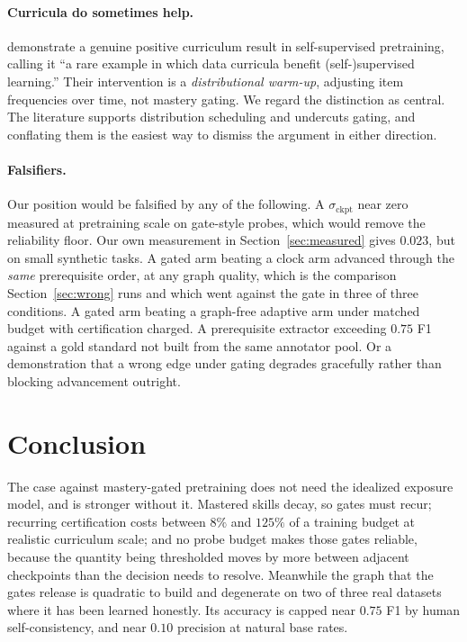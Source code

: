 \documentclass[11pt]{article}
\theoremstyle{plain}
\theoremstyle{definition}
\theoremstyle{remark}
\begin{document}
\paragraph{Curricula do sometimes help.} \citet{zucchet2025facts} demonstrate a
genuine positive curriculum result in self-supervised pretraining, calling it ``a
rare example in which data curricula benefit (self-)supervised learning.'' Their
intervention is a \emph{distributional warm-up}, adjusting item frequencies over
time, not mastery gating. We regard the distinction as central. The literature
supports distribution scheduling and undercuts gating, and conflating them is the
easiest way to dismiss the argument in either direction.

\paragraph{Falsifiers.} Our position would be falsified by any of the following.
A $\sigma_{\text{ckpt}}$ near zero measured at pretraining scale on gate-style
probes, which would remove the reliability floor. Our own measurement in
Section~\ref{sec:measured} gives $0.023$, but on small synthetic tasks. A gated
arm beating a clock arm advanced through the \emph{same} prerequisite order, at
any graph quality, which is the comparison Section~\ref{sec:wrong} runs and which
went against the gate in three of three conditions. A gated arm beating a
graph-free adaptive arm under matched budget with certification charged. A
prerequisite extractor exceeding $0.75$ F1 against a gold standard not built from
the same annotator pool. Or a demonstration that a wrong edge under gating
degrades gracefully rather than blocking advancement outright.

\section{Conclusion}

The case against mastery-gated pretraining does not need the idealized exposure
model, and is stronger without it. Mastered skills decay, so gates must recur;
recurring certification costs between $8\%$ and $125\%$ of a training budget at
realistic curriculum scale; and no probe budget makes those gates reliable,
because the quantity being thresholded moves by more between adjacent checkpoints
than the decision needs to resolve. Meanwhile the graph that the gates release is
quadratic to build and degenerate on two of three real datasets where it has been
learned honestly. Its accuracy is capped near $0.75$ F1 by human
self-consistency, and near $0.10$ precision at natural base rates.
\end{document}
